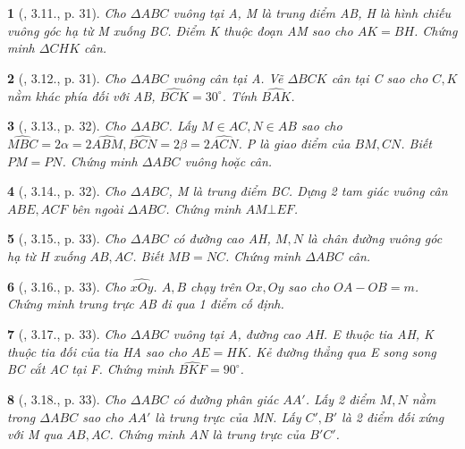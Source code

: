 \documentclass{article}
\newtheorem{baitoan}{}
\begin{document}
\begin{baitoan}[\cite{Hung_Mai_Toan_7_hinh_hoc}, 3.11., p. 31]
	Cho $\Delta ABC$ vuông tại A, M là trung điểm AB, H là hình chiếu vuông góc hạ từ M xuống BC. Điểm K thuộc đoạn AM sao cho $AK = BH$. Chứng minh $\Delta CHK$ cân.
\end{baitoan}

\begin{baitoan}[\cite{Hung_Mai_Toan_7_hinh_hoc}, 3.12., p. 31]
	Cho $\Delta ABC$ vuông cân tại A. Vẽ $\Delta BCK$ cân tại C sao cho $C,K$ nằm khác phía đối với AB, $\widehat{BCK} = 30^\circ$. Tính $\widehat{BAK}$.
\end{baitoan}

\begin{baitoan}[\cite{Hung_Mai_Toan_7_hinh_hoc}, 3.13., p. 32]
	Cho $\Delta ABC$. Lấy $M\in AC,N\in AB$ sao cho $\widehat{MBC} = 2\alpha = 2\widehat{ABM},\widehat{BCN} = 2\beta = 2\widehat{ACN}$. P là giao điểm của $BM,CN$. Biết $PM = PN$. Chứng minh $\Delta ABC$ vuông hoặc cân.
\end{baitoan}

\begin{baitoan}[\cite{Hung_Mai_Toan_7_hinh_hoc}, 3.14., p. 32]
	Cho $\Delta ABC$, M là trung điểm BC. Dựng 2 tam giác vuông cân $ABE,ACF$ bên ngoài $\Delta ABC$. Chứng minh $AM\bot EF$.
\end{baitoan}

\begin{baitoan}[\cite{Hung_Mai_Toan_7_hinh_hoc}, 3.15., p. 33]
	Cho $\Delta ABC$ có đường cao AH, $M,N$ là chân đường vuông góc hạ từ H xuống $AB,AC$. Biết $MB = NC$. Chứng minh $\Delta ABC$ cân.
\end{baitoan}

\begin{baitoan}[\cite{Hung_Mai_Toan_7_hinh_hoc}, 3.16., p. 33]
	Cho $\widehat{xOy}$. $A,B$ chạy trên $Ox,Oy$ sao cho $OA - OB = m$. Chứng minh trung trực AB đi qua 1 điểm cố định.
\end{baitoan}

\begin{baitoan}[\cite{Hung_Mai_Toan_7_hinh_hoc}, 3.17., p. 33]
	Cho $\Delta ABC$ vuông tại A, đường cao AH. E thuộc tia AH, K thuộc tia đối của tia HA sao cho $AE = HK$. Kẻ đường thẳng qua E song song BC cắt AC tại F. Chứng minh $\widehat{BKF} = 90^\circ$.
\end{baitoan}

\begin{baitoan}[\cite{Hung_Mai_Toan_7_hinh_hoc}, 3.18., p. 33]
	Cho $\Delta ABC$ có đường phân giác $AA'$. Lấy 2 điểm $M,N$ nằm trong $\Delta ABC$ sao cho $AA'$ là trung trực của MN. Lấy $C',B'$ là 2 điểm đối xứng với M qua $AB,AC$. Chứng minh AN là trung trực của $B'C'$.
\end{baitoan}
\end{document}
